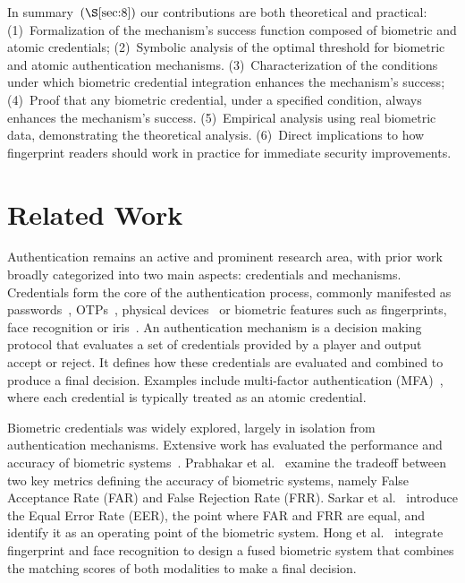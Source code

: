 \documentclass[sigconf]{acmart}
\theoremstyle{definition}
\begin{document}
In summary~$(\S\ref{sec:8})$ our contributions are both theoretical and practical: (1)~Formalization of the mechanism's success function composed of biometric and atomic credentials; (2)~Symbolic analysis of the optimal threshold for biometric and atomic authentication mechanisms. (3)~Characterization of the conditions under which biometric credential integration enhances the mechanism's success; (4)~Proof that any biometric credential, under a specified condition, always enhances the mechanism's success. (5)~Empirical analysis using real biometric data, demonstrating the theoretical analysis. (6)~Direct implications to how fingerprint readers should work in practice for immediate security improvements.

\section{Related Work}\label{sec:2}
Authentication remains an active and prominent research area, with prior work broadly categorized into two main aspects: credentials and mechanisms. Credentials form the core of the authentication process, commonly manifested as passwords~\cite{password1979}, OTPs~\cite{otp2017}, physical devices~\cite{FIDO2021} or biometric features such as fingerprints, face recognition or iris~\cite{anil2004}. An authentication mechanism is a decision making protocol that evaluates a set of credentials provided by a player and output accept or reject\cite{MattBishop2004,schneider_auth_people}. It defines how these credentials are evaluated and combined to produce a final decision. Examples include multi-factor authentication (MFA)~\cite{Abhishek2013}, where each credential is typically treated as an atomic credential. 

Biometric credentials was widely explored, largely in isolation from authentication mechanisms. Extensive work has evaluated the performance and accuracy of biometric systems~\cite{Cappelli2006,Maio2002,Anil1997,LivDet2009,LivDet2011,LivDet2013,LivDet2015}. Prabhakar et al.~\cite{prabhakar2003} examine the tradeoff between two key metrics defining the accuracy of biometric systems, namely False Acceptance Rate (FAR) and False Rejection Rate (FRR). Sarkar et al.~\cite{sarkar2020}   introduce the Equal Error Rate (EER), the point where FAR and FRR are equal, and identify it as an operating point of the biometric system. Hong et al.~\cite{hong1998} integrate fingerprint and face recognition to design a fused biometric system that combines the matching scores of both modalities to make a final decision. 
\end{document}
